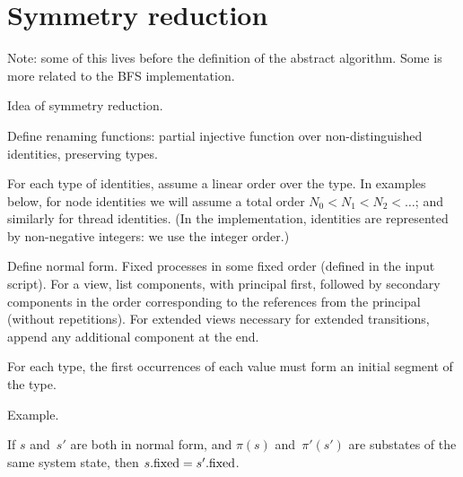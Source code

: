 \section{Symmetry reduction}

Note: some of this lives before the definition of the abstract algorithm.
Some is more related to the BFS implementation. 

Idea of symmetry reduction.

Define renaming functions: partial injective function over non-distinguished
identities, preserving types.

For each type of identities, assume a linear order over the type.  In examples
below, for node identities we will assume a total order $N_0 < N_1 < N_2 <
\ldots$; and similarly for thread identities.  (In the implementation,
identities are represented by non-negative integers: we use the integer
order.)

\begin{definition}
Define normal form.  Fixed processes in some fixed order (defined in the input
script).  For a view, list components, with principal first, followed by
secondary components in the order corresponding to the references from the
principal (without repetitions).  For extended views necessary for extended
transitions, append any additional component at the end.

For each type, the first occurrences of each value must form an
initial segment of the type.
\end{definition}


Example.

\begin{lemma}
If $s$ and~$s'$ are both in normal form, and $\pi(s)$ and~$\pi'(s')$ are
substates of the same system state, then $s.\mathrm{fixed} = s'.\mathrm{fixed}$.
\end{lemma}
